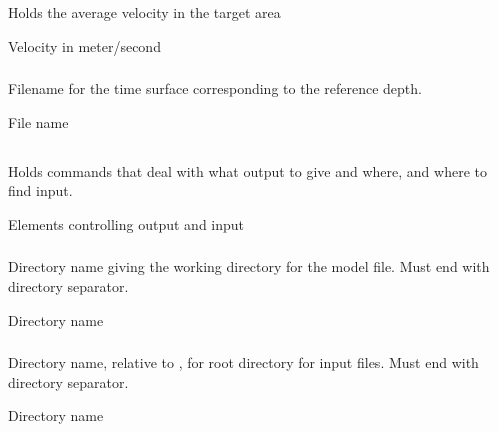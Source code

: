 \subsubsection{} 
 \slist
   \item \Description Holds the average velocity in the target area
   \item \Argument Velocity in meter/second
   \item \Default
\elist

\subsubsection{} 
 \slist
   \item \Description Filename for the time surface corresponding to the reference depth.
   \item \Argument File name
   \item \Default
\elist

\subsection{} 
 \slist
   \item \Description Holds commands that deal with what output to give and where, and where to find input.
   \item \Argument Elements controlling output and input
   \item \Default
 \elist

\subsubsection{} 
 \slist
   \item \Description Directory name giving the working directory for the model file. Must end with directory separator.
   \item \Argument Directory name
   \item \Default
 \elist

\subsubsection{} 
 \slist
   \item \Description Directory name, relative to , for root directory for input files. Must end with directory separator.
   \item \Argument Directory name
   \item \Default
 \elist

